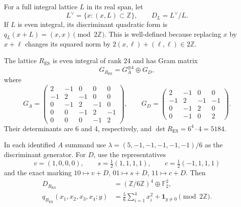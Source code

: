 For a full integral lattice \(L\) in its real span, let
\[
 L^\vee=\{x:(x,L)\subset\mathbb Z\},\qquad D_L=L^\vee/L.
\]
If \(L\) is even integral, its discriminant quadratic form is
\(q_L(x+L)=(x,x)\pmod {2\mathbb Z}\).  This is well-defined because
replacing \(x\) by \(x+\ell\) changes its squared norm by
\(2(x,\ell)+(\ell,\ell)\in2\mathbb Z\).

\begin{theorem}
\label{esn:thm:root-discriminant}
The lattice \(R_{\mathrm{ES}}\) is even integral of rank 24 and has
Gram matrix
\[
 G_{R_{\mathrm{ES}}}=G_A^{\oplus4}\oplus G_D,
\]
where
\[
 G_A=\begin{pmatrix}
 2&-1&0&0&0\\-1&2&-1&0&0\\0&-1&2&-1&0\\
 0&0&-1&2&-1\\0&0&0&-1&2
 \end{pmatrix},\qquad
 G_D=\begin{pmatrix}
 2&-1&0&0\\-1&2&-1&-1\\0&-1&2&0\\0&-1&0&2
 \end{pmatrix}.
\]
Their determinants are 6 and 4, respectively, and
\(\det R_{\mathrm{ES}}=6^4\cdot4=5184\).

In each identified \(A\) summand use
\(\lambda=(5,-1,-1,-1,-1,-1)/6\) as the discriminant generator.
For \(D\), use the representatives
\begin{equation}
 v=(1,0,0,0),\qquad s=\tfrac12(1,1,1,1),\qquad
 c=\tfrac12(-1,1,1,1)
 \label{esn:eq:d4-representatives}
\end{equation}
and the exact marking \(10\mapsto v+D\), \(01\mapsto s+D\),
\(11\mapsto c+D\).  Then
\begin{equation}
 \begin{split}
 D_{R_{\mathrm{ES}}}&=(\mathbb Z/6\mathbb Z)^4\oplus\mathbb F_2^2,\\
 q_{R_{\mathrm{ES}}}(x_1,x_2,x_3,x_4;y)
   &=\frac56\sum_{i=1}^4x_i^2+\mathbf1_{y\ne0}
                                              \pmod {2\mathbb Z}.
 \end{split}
 \label{esn:eq:full-discriminant}
\end{equation}
\end{theorem}

